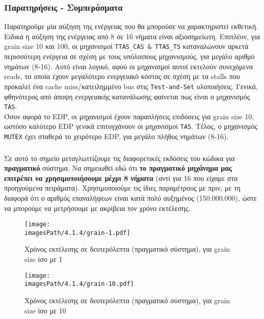 \documentclass[12pt,a4paper]{article}
\newcommand{\imagesPath}{/home/nick/arch-ntua/ex03/graphs}
\newcommand{\myWidth}{0.8\linewidth}
\begin{document}
			\subsubsection*{Παρατηρήσεις - Συμπεράσματα}				
				Παρατηρούμε μία αύξηση της ενέργειας που θα μπορούσε να χαρακτηριστεί εκθετική. Ειδικά η αύξηση της ενέργειας από 8 σε 16 νήματα είναι αξιοσημείωτη. Επιπλέον, για grain size 10 και 100, οι μηχανισμοί \verb|TTAS_CAS & TTAS_TS| καταναλώνουν αρκετά περισσότερη ενέργεια σε σχέση με τους υπόλοιπους μηχανισμούς, για μεγάλο αριθμό νημάτων (8-16). Αυτό είναι λογικό, αφού οι μηχανισμοί αυτοί εκτελούν συνεχόμενα reads, τα οποία έχουν μεγαλύτερο ενεργειακό κόστος σε σχέση με τα stalls που προκαλεί ένα cache miss/κατειλημμένο bus στις \verb|Test-and-Set| υλοποιήσεις. Γενικά, φθηνότερος από άποψη ενεργειακής κατανάλωσης φαίνεται πως είναι ο μηχανισμός \verb|TAS|. \\
				
				Όσον αφορά το EDP, οι μηχανισμοί έχουν παραπλήσεις επιδόσεις για grain size 10, ωστόσο καλύτερο EDP γενικά επιτυγχάνουν οι μηχανισμοί \verb|TAS|. Τέλος, ο μηχανισμός \verb|MUTEX| έχει σταθερά το χειρότερο EDP, για μεγάλο πλήθος νημάτων (8-16).
				
			\subsubsection{}
				Σε αυτό το σημείο μεταγλωττίζουμε τις διαφορετικές εκδόσεις του κώδικα για \textbf{πραγματικό} σύστημα. Να σημειωθεί εδώ ότι \textbf{το πραγματικό μηχάνημα μας επιτρέπει να χρησιμοποιήσουμε μέχρι 8 νήματα} (αντί για 16 που είχαμε στα προηγούμενα πειράματα). Χρησιμοποιούμε τις ίδιες παραμέτρους με πριν, με τη διαφορά ότι ο αριθμός επαναλήψεων είναι κατά πολύ αυξημένος (150.000.000), ώστε να μπορούμε να μετρήσουμε με ακρίβεια τον χρόνο εκτέλεσης.
			
				\begin{figure}[H]
					\begin{center}
						\texttt{[image: \\imagesPath/4.1.4/grain-1.pdf]}
						\caption{Χρόνος εκτέλεσης σε δευτερόλεπτα (πραγματικό σύστημα), για grain size ίσο με 1}
					\end{center}
				\end{figure}
			
				\begin{figure}[H]
					\begin{center}
						\texttt{[image: \\imagesPath/4.1.4/grain-10.pdf]}
						\caption{Χρόνος εκτέλεσης σε δευτερόλεπτα (πραγματικό σύστημα), για grain size ίσο με 10}
					\end{center}
				\end{figure}
			
\end{document}
